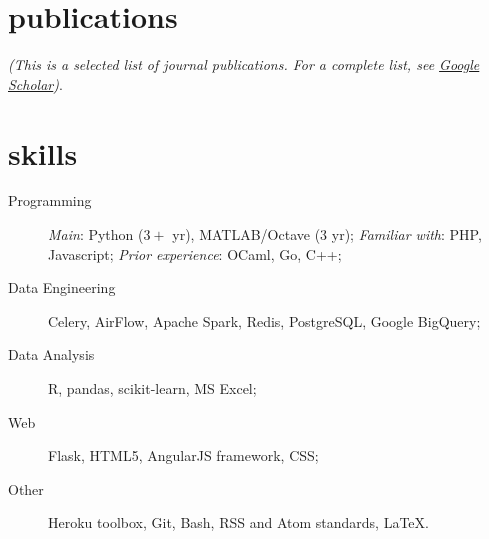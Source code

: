 \documentclass[]{friggeri-cv}
\begin{document}
\section{publications}
\emph{(This is a selected list of journal publications. For a complete list, see \href{https://scholar.google.com/citations?user=MDj6ntQAAAAJ&hl=en}{Google Scholar})}.
\vspace{5mm}
\section{skills}
\begin{description}
\item[Programming] \emph{Main}: Python ($3+$ yr), MATLAB/Octave ($3$ yr); \emph{Familiar with}: PHP, Javascript; \emph{Prior experience}: OCaml, Go, C++;
\item[Data Engineering] Celery, AirFlow, Apache Spark, Redis, PostgreSQL, Google BigQuery;
\item[Data Analysis] R, pandas, scikit-learn, MS Excel;
\item[Web] Flask, HTML5, AngularJS framework, CSS;
\item[Other] Heroku toolbox, Git, Bash, RSS and Atom standards, \LaTeX.
\end{description}
\end{document}
